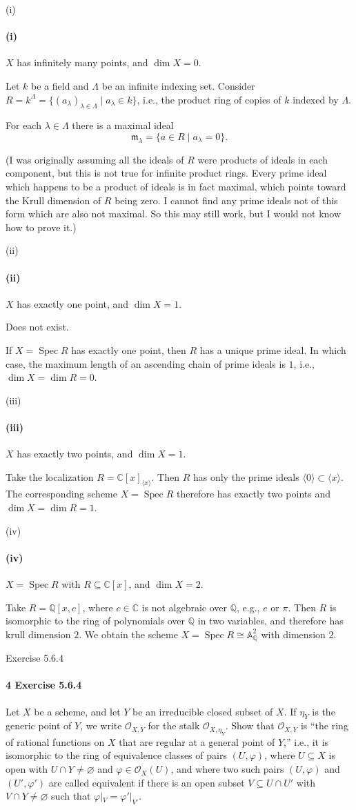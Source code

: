 \documentclass[12pt]{article}
\newlength{\myparskip}
\newenvironment{fullbox}{\begin{lrbox}{\savefullbox}\begin{minipage}{\dimexpr\textwidth-2\fboxsep\relax}\setlength{\parskip}{\myparskip}}{\end{minipage}\end{lrbox}\framebox[\textwidth]{\usebox{\savefullbox}}}
\newenvironment{pbox}[1][]{\begin{fullbox}\ifx#1\empty\else\paragraph{#1}\phantom{}\fi}{\end{fullbox}}
\theoremstyle{definition}
\newcommand{\Q}{\mathbb{Q}}
\newcommand{\C}{\mathbb{C}}
\newcommand{\A}{\mathbb{A}}
\renewcommand{\phi}{\varphi}
\renewcommand{\emptyset}{\varnothing}
\newcommand{\<}{\langle}
\renewcommand{\>}{\rangle}
\newcommand{\isom}{\cong}
\DeclareMathOperator{\Spec}{Spec}
\renewcommand{\O}{\mathcal{O}}
\newcommand{\mm}{\mathfrak{m}}
\begin{document}
\begin{pbox}[(i)]
    $X$ has infinitely many points, and $\dim X = 0$.
\end{pbox}

Let $k$ be a field and $\Lambda$ be an infinite indexing set.
Consider $R = k^\Lambda = \{(a_\lambda)_{\lambda \in \Lambda} \mid a_\lambda \in k\}$, i.e., the product ring of copies of $k$ indexed by $\Lambda$.

For each $\lambda \in \Lambda$ there is a maximal ideal
\[
    \mm_\lambda = \{a \in R \mid a_\lambda = 0\}.
\]

(I was originally assuming all the ideals of $R$ were products of ideals in each component, but this is not true for infinite product rings.
Every prime ideal which happens to be a product of ideals is in fact maximal, which points toward the Krull dimension of $R$ being zero.
I cannot find any prime ideals not of this form which are also not maximal.
So this may still work, but I would not know how to prove it.)

\begin{pbox}[(ii)]
    $X$ has exactly one point, and $\dim X = 1$.
\end{pbox}

Does not exist.

If $X = \Spec R$ has exactly one point, then $R$ has a unique prime ideal.
In which case, the maximum length of an ascending chain of prime ideals is $1$, i.e., $\dim X = \dim R = 0$.


\begin{pbox}[(iii)]
    $X$ has exactly two points, and $\dim X = 1$.
\end{pbox}

Take the localization $R = \C[x]_{\<x\>}$.
Then $R$ has only the prime ideals $\<0\> \subset \<x\>$.
The corresponding scheme $X = \Spec R$ therefore has exactly two points and $\dim X = \dim R = 1$.

\begin{pbox}[(iv)]
    $X = \Spec R$ with $R \subseteq \C[x]$, and $\dim X = 2$.
\end{pbox}

Take $R = \Q[x, c]$, where $c \in \C$ is not algebraic over $\Q$, e.g., $e$ or $\pi$.
Then $R$ is isomorphic to the ring of polynomials over $\Q$ in two variables, and therefore has krull dimension $2$.
We obtain the scheme $X = \Spec R \isom \A_\Q^2$ with dimension $2$.


\newpage
\begin{pbox}[4 Exercise 5.6.4]
    Let $X$ be a scheme, and let $Y$ be an irreducible closed subset of $X$.
    If $\eta_Y$ is the generic point of $Y$, we write $\O_{X, Y}$ for the stalk $\O_{X, \eta_Y}$.
    Show that $\O_{X, Y}$ is ``the ring of rational functions on $X$ that are regular at a general point of $Y$,'' i.e., it is isomorphic to the ring of equivalence classes of pairs $(U, \phi)$, where $U \subseteq X$ is open with $U \cap Y \ne \emptyset$ and $\phi \in \O_X(U)$, and where two such pairs $(U, \phi)$ and $(U', \phi')$ are called equivalent if there is an open subset $V \subseteq U \cap U'$ with $V \cap Y \ne \emptyset$ such that $\phi|_V = \phi'|_{V'}$.
\end{pbox}
\end{document}
